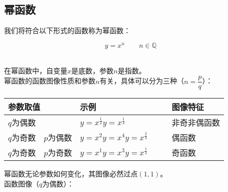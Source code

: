 \documentclass[UTF8]{ctexart}
\begin{document}
\subsection{幂函数}
    我们将符合以下形式的函数称为幂函数：
    \begin{large}
        \begin{equation*}
            y=x^n\qquad n\in\mathbb{Q}
        \end{equation*}
    \end{large}\\
    在幂函数中，自变量$x$是底数，参数$n$是指数。\\[3mm]
    幂函数的函数图像性质和参数$n$有关，具体可以分为三种（$n=\dfrac{p}{q}$）：
    \begin{center}
        \begin{tabular}{l|l|l}
            \hline
            参数取值&示例&图像特征\\ \hline
            $q$为偶数&$y=x^\frac{1}{2}$\quad$y=x^\frac{1}{4}$&非奇非偶函数\qquad\\ \hline
            $q$为奇数~~$p$为偶数\qquad\qquad&$y=x^2$\quad$y=x^4$\quad$y=x^{\frac{2}{3}}\qquad$&偶函数\\ \hline
            $q$为奇数~~$p$为奇数\qquad\qquad&$y=x^1$\quad$y=x^3$\quad$y=x^{\frac{1}{3}}\qquad$&奇函数\\ \hline
        \end{tabular}
    \end{center}
    \vspace{10pt}
    幂函数无论参数如何变化，其图像必然过点$(1,1)$。\\[3mm]
    函数图像（$q$为偶数）：
\end{document}
